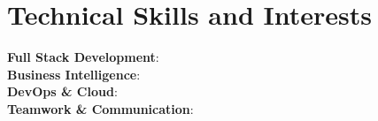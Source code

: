 \section{\textbf{Technical Skills and Interests}}
\begin{itemize}[leftmargin=0.1in, label={}]
   \small{\item{
    \textbf{Full Stack Development}{: }  \\
    \textbf{Business Intelligence}{: }  \\
    \textbf{DevOps \& Cloud}{: }  \\
    \textbf{Teamwork \& Communication}{: }  \\
   }}
\end{itemize}
\vspace{-16pt} 